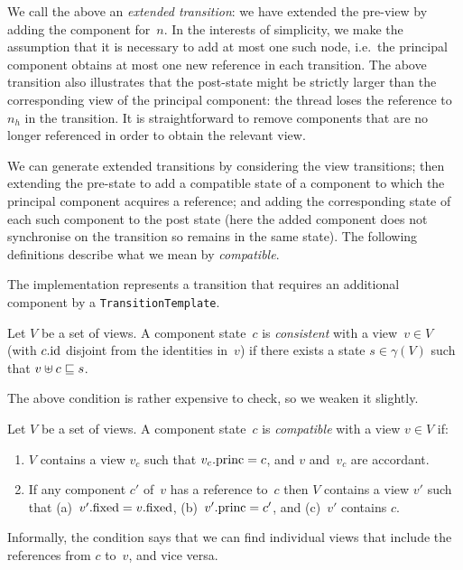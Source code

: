 %
%
We call the above an \emph{extended transition}: we have extended the pre-view
by adding the component for~$n$.  In the interests of simplicity, we make the
assumption that it is necessary to add at most one such node, i.e.~the
principal component obtains at most one new reference in each transition.
The above transition also illustrates that the post-state might be strictly
larger than the corresponding view of the principal component: the thread
loses the reference to~$n_h$ in the transition.  It is straightforward to remove
components that are no longer referenced in order to obtain the relevant view.

We can generate extended transitions by considering the view transitions; then
extending the pre-state to add a compatible state of a component to which the
principal component acquires a reference; and adding the corresponding state
of each such component to the post state (here the added component does not
synchronise on the transition so remains in the same state).  The following
definitions describe what we mean by \emph{compatible}.

\begin{impNote}
The implementation represents a transition that requires an
  additional component by a \texttt{TransitionTemplate}.
\end{impNote}

\begin{definition}
Let $V$ be a set of views.  A component state~$c$ is \emph{consistent} with a
view~$v \in V$ (with $c.\mathrm{id}$ disjoint from the identities in~$v$) if there
exists a state $s \in \gamma(V)$ such that $v \uplus c \sqsubseteq s$.
\end{definition}
%
The above condition is rather expensive to check, so we weaken it slightly. 
%
\begin{definition}
\label{def:compatible}
Let $V$ be a set of views.  A component state~$c$ is \emph{compatible} with a
view $v \in V$ if:
%
\begin{enumerate}
\item\label{item:compatible-1} $V$ contains a view $v_c$ such that $v_c.\mathrm{princ}
  = c$, and $v$ and~$v_c$ are accordant.


\item\label{item:compatible-2} If any component $c'$ of~$v$ has a reference
  to~$c$ then $V$ contains a view $v'$ such that (a)~$v'.\mathrm{fixed} = v.\mathrm{fixed}$,
  (b)~$v'.\mathrm{princ} = c'$, and (c)~$v'$ contains $c$.
\end{enumerate}
\end{definition}
%
Informally, the condition says that we can find individual views that include
the references from $c$ to~$v$, and vice versa. 

